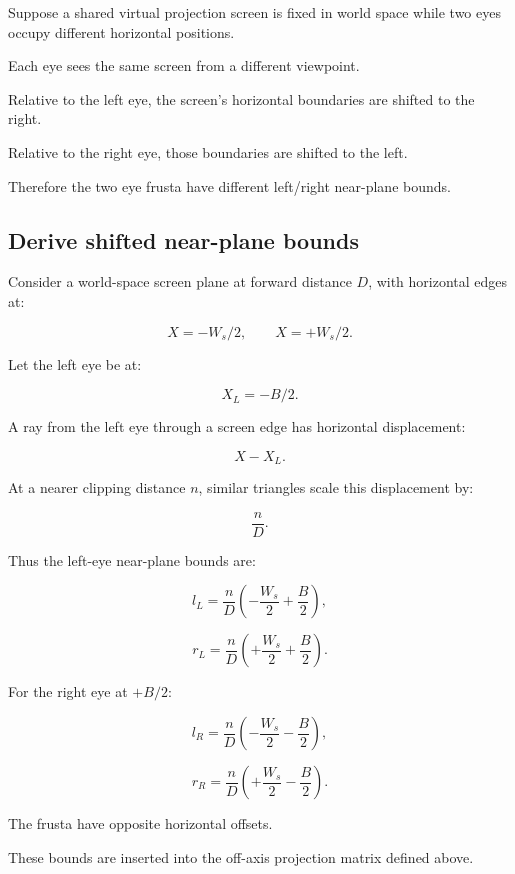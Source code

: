 \hypertarget{02-foundations-ii-ch035-why-asymmetry-appears}{}

Suppose a shared virtual projection screen is fixed in world space while two eyes occupy different horizontal positions.

Each eye sees the same screen from a different viewpoint.

Relative to the left eye, the screen's horizontal boundaries are shifted to the right.

Relative to the right eye, those boundaries are shifted to the left.

Therefore the two eye frusta have different left/right near-plane bounds.

\subsection{Derive shifted near-plane bounds}\label{02-foundations-ii-ch035-derive-shifted-near-plane-bounds}

\hypertarget{02-foundations-ii-ch035-derive-shifted-near-plane-bounds}{}

Consider a world-space screen plane at forward distance \(D\), with horizontal edges at:

\[ X=-W_s/2,\qquad X=+W_s/2. \]

Let the left eye be at:

\[ X_L=-B/2. \]

A ray from the left eye through a screen edge has horizontal displacement:

\[ X-X_L. \]

At a nearer clipping distance \(n\), similar triangles scale this displacement by:

\[ \frac nD. \]

Thus the left-eye near-plane bounds are:

\[ \boxed{ l_L=\frac nD\left(-\frac{W_s}{2}+\frac B2\right), } \]

\[ \boxed{ r_L=\frac nD\left(+\frac{W_s}{2}+\frac B2\right). } \]

For the right eye at \(+B/2\):

\[ \boxed{ l_R=\frac nD\left(-\frac{W_s}{2}-\frac B2\right), } \]

\[ \boxed{ r_R=\frac nD\left(+\frac{W_s}{2}-\frac B2\right). } \]

The frusta have opposite horizontal offsets.

These bounds are inserted into the off-axis projection matrix defined above.

